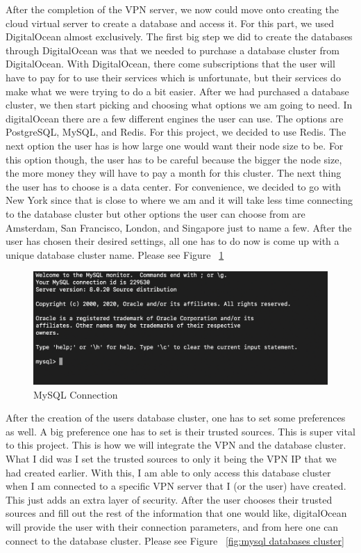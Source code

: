 After the completion of the VPN server, we now could move onto creating the cloud virtual
server to create a database and access it. For this part, we used DigitalOcean
almost exclusively. The first big step we did to create the databases through
DigitalOcean was that we needed to purchase a database cluster from DigitalOcean.
With DigitalOcean, there come subscriptions that the user will have to pay for to
use their services which is unfortunate, but their services do make what we were trying to
do a bit easier. After we had purchased a database cluster, we then start picking and choosing
what options we am going to need. In digitalOcean there are a few different engines the user can
use. The options are PostgreSQL, MySQL, and Redis. For this project, we decided to
use Redis. The next option the user has is how large one would want their node size to be. For this
option though, the user has to be careful because the bigger the node size, the more money
they will have to pay a month for this cluster. The next thing the user has to choose is
a data center. For convenience, we decided to go with New York since that is close to where
we am and it will take less time connecting to the database cluster but other options
the user can choose from are Amsterdam, San Francisco, London, and Singapore just to name a few.
After the user has chosen their desired settings, all one has to do now is come up with a unique
database cluster name. Please see Figure ~\ref{fig:mysql connection}



\bigskip
\bigskip
\bigskip

\bigskip
\begin{figure}[hbt!]
\centering
\includegraphics[width=5in]{../images/mysql-terminal.png}%
\caption{MySQL Connection}
\label{fig:mysql connection}
\end{figure}
\bigskip




After the creation of the users database cluster, one has to set some preferences as well.
A big preference one has to set is their trusted sources. This is super vital to this
project. This is how we will integrate the VPN and the database cluster. What I
did was I set the trusted sources to only it being the VPN IP that we had created earlier.
With this, I am able to only access this database cluster when I am connected to a specific
VPN server that I (or the user) have created. This just adds an extra layer of security.
After the user chooses their trusted sources and fill out the rest of the information that one
would like, digitalOcean will provide the user with their connection parameters, and from here
one can connect to the database cluster. Please see Figure ~\ref{fig:mysql databases cluster}


